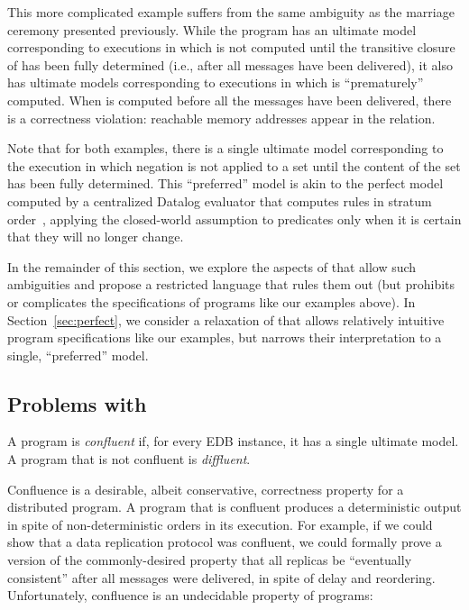 This more complicated example suffers from the same ambiguity as the marriage
ceremony presented previously.  While the program has an ultimate model
corresponding to executions in which  is not computed until the
transitive closure of  has been fully determined (i.e.,
after all messages have been delivered), it also has ultimate models
corresponding to executions in which  is ``prematurely''
computed.  When  is computed before all the 
messages have been delivered, there is a correctness violation: reachable memory
addresses appear in the  relation.

Note that for both examples, there is a single ultimate model corresponding to
the execution in which negation is not applied to a set until the content of the
set has been fully determined.  This ``preferred'' model is akin to the perfect
model computed by a centralized Datalog evaluator that computes rules in stratum
order~\cite{ullmanbook}, applying the closed-world assumption to predicates only
when it is certain that they will no longer change.

In the remainder of this section, we explore the aspects of \lang that allow
such ambiguities and propose a restricted language \slang that rules them out
(but prohibits or complicates the specifications of programs like our examples above).  In
Section~\ref{sec:perfect}, we consider a relaxation of \slang that allows relatively intuitive program specifications like our examples, but narrows their interpretation to a
single, ``preferred'' model.

\subsection{Problems with \large \bf \lang}

\begin{definition}
  A \lang program is {\em confluent} if, for every EDB instance, it has a single ultimate model.  A program that is not confluent is {\em diffluent}.
\end{definition}


Confluence is a desirable, albeit conservative, correctness property for a distributed program.  A program that is
confluent produces a deterministic output in spite of non-deterministic orders in its execution.  For example, if
we could show that a data replication protocol was confluent, we could formally prove a version of the commonly-desired property that all replicas be ``eventually consistent''
after all messages were delivered, in spite of delay and reordering.
Unfortunately, confluence is an undecidable property of \lang programs:

